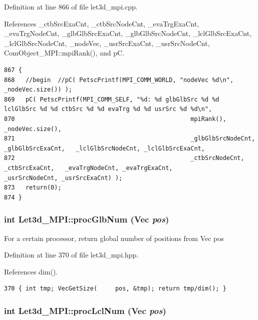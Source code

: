 Definition at line 866 of file let3d\_\-mpi.cpp.

References \_\-ctb\-Src\-Exa\-Cnt, \_\-ctb\-Src\-Node\-Cnt, \_\-eva\-Trg\-Exa\-Cnt, \_\-eva\-Trg\-Node\-Cnt, \_\-glb\-Glb\-Src\-Exa\-Cnt, \_\-glb\-Glb\-Src\-Node\-Cnt, \_\-lcl\-Glb\-Src\-Exa\-Cnt, \_\-lcl\-Glb\-Src\-Node\-Cnt, \_\-node\-Vec, \_\-usr\-Src\-Exa\-Cnt, \_\-usr\-Src\-Node\-Cnt, Com\-Object\_\-MPI::mpi\-Rank(), and p\-C.

\footnotesize\begin{verbatim}867 {
868   //begin  //pC( PetscPrintf(MPI_COMM_WORLD, "nodeVec %d\n", _nodeVec.size()) );
869   pC( PetscPrintf(MPI_COMM_SELF, "%d: %d glbGlbSrc %d %d  lclGlbSrc %d %d ctbSrc %d %d evaTrg %d %d usrSrc %d %d\n",
870                                                 mpiRank(), _nodeVec.size(),
871                                                 _glbGlbSrcNodeCnt, _glbGlbSrcExaCnt,   _lclGlbSrcNodeCnt, _lclGlbSrcExaCnt,
872                                                 _ctbSrcNodeCnt, _ctbSrcExaCnt,   _evaTrgNodeCnt, _evaTrgExaCnt,                 _usrSrcNodeCnt, _usrSrcExaCnt) );
873   return(0);
874 }
\end{verbatim}\normalsize 


\subsubsection{\setlength{\rightskip}{0pt plus 5cm}int Let3d\_\-MPI::proc\-Glb\-Num (Vec {\em pos})\hspace{0.3cm}{\tt  [inline]}}\label{classLet3d__MPI_47cb2afea618c56a5cc6e05f4034a806_47cb2afea618c56a5cc6e05f4034a806}


For a certain processor, return global number of positions from Vec pos 

Definition at line 370 of file let3d\_\-mpi.hpp.

References dim().

\footnotesize\begin{verbatim}370 { int tmp; VecGetSize(     pos, &tmp); return tmp/dim(); }
\end{verbatim}\normalsize 


\subsubsection{\setlength{\rightskip}{0pt plus 5cm}int Let3d\_\-MPI::proc\-Lcl\-Num (Vec {\em pos})\hspace{0.3cm}{\tt  [inline]}}\label{classLet3d__MPI_21f80b863e1376ff6648d882fdabd08e_21f80b863e1376ff6648d882fdabd08e}


